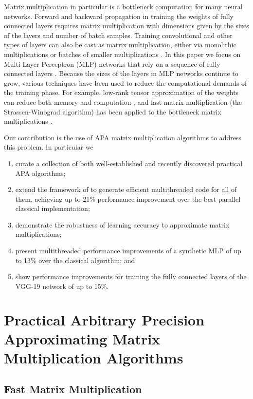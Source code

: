 \documentclass[manuscript]{acmart}
\begin{document}
Matrix multiplication in particular is a bottleneck computation for many neural networks.
Forward and backward propagation in training the weights of fully connected layers requires matrix multiplication with dimensions given by the sizes of the layers and number of batch samples.
Training convolutional and other types of layers can also be cast as matrix multiplication, either via monolithic multiplications or batches of smaller multiplications \cite{CW+14,GB+19}.
In this paper we focus on Multi-Layer Perceptron (MLP) networks that rely on a sequence of fully connected layers \cite{HSW89}.
Because the sizes of the layers in MLP networks continue to grow, various techniques have been used to reduce the computational demands of the training phase.
For example, low-rank tensor approximation of the weights can reduce both memory and computation \cite{NPOV15}, and fast matrix multiplication (the Strassen-Winograd algorithm) has been applied to the bottleneck matrix multiplications \cite{KAA20}.

Our contribution is the use of APA matrix multiplication algorithms to address this problem.
In particular we
\begin{enumerate}
	\item curate a collection of both well-established and recently discovered practical APA algorithms;
	\item extend the framework of \cite{BB15} to generate efficient multithreaded code for all of them, achieving up to 21\% performance improvement over the best parallel classical implementation;
	\item demonstrate the robustness of learning accuracy to approximate matrix multiplications;
	\item present multithreaded performance improvements of a synthetic MLP of up to 13\% over the classical algorithm; and
	\item show performance improvements for training the fully connected layers of the VGG-19 network of up to 15\%.
\end{enumerate}

\section{Practical Arbitrary Precision Approximating Matrix Multiplication Algorithms}
\label{sec:APA}

\subsection{Fast Matrix Multiplication}
\end{document}

